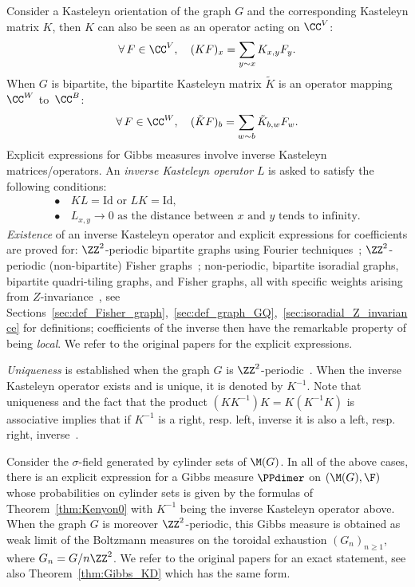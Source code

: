 \documentclass[a4paper,twoside,11pt]{article}
\begin{document}
Consider a Kasteleyn orientation of the graph $G$ and the corresponding Kasteleyn matrix $K$, then $K$ 
can also be seen as an operator acting on $\CC^V$:
\[
\forall\,F\in\CC^V,\quad (KF)_x=\sum_{y\sim x}K_{x,y}F_y.
\]
When $G$ is bipartite, the bipartite Kasteleyn matrix $\tilde{K}$ is an operator mapping $\CC^W$ to~$\CC^B$:
\[
\forall\,F\in\CC^W,\quad (\tilde{K}F)_b=\sum_{w\sim b}\tilde{K}_{b,w}F_w.
\]
Explicit expressions for Gibbs measures involve inverse Kasteleyn matrices/operators. An \emph{inverse Kasteleyn operator}
$L$ is asked to satisfy the following conditions:
\begin{align*}
\bullet &\, KL=\mathrm{Id} \text{ or } LK=\mathrm{Id},\\
\bullet &\, L_{x,y}\rightarrow 0 \text{ as the distance between $x$ and $y$ tends to infinity}.
\end{align*}
\emph{Existence} of an inverse Kasteleyn operator and explicit expressions for coefficients are proved for:
$\ZZ^2$-periodic bipartite graphs using Fourier techniques~\cite{CKP,KOS};  $\ZZ^2$-periodic (non-bipartite) 
Fisher graphs~\cite{BoutillierdeTiliere:iso_perio,Dubedat}; non-periodic, bipartite isoradial graphs, bipartite quadri-tiling graphs,
and Fisher graphs, all with specific weights arising from $Z$-invariance~\cite{Kenyon3,BoutillierdeTiliere:iso_gen,BdtR2}, 
see Sections~\ref{sec:def_Fisher_graph},~\ref{sec:def_graph_GQ},~\ref{sec:isoradial_Z_invariance} for definitions;
coefficients of the inverse then have the remarkable property of being \emph{local}. We refer to the original papers for the explicit expressions. 

\emph{Uniqueness} is established when the graph $G$ is $\ZZ^2$-periodic~\cite{Sheffield0,BoutillierdeTiliere:iso_perio}. When the inverse
Kasteleyn operator exists and is unique, it is denoted by $K^{-1}$. Note that uniqueness and the fact that the product 
$(K K^{-1})K=K(K^{-1}K)$ is associative implies that if $K^{-1}$ is a right, resp. left, inverse it is also a left, resp. right, 
inverse~\cite{Cooke}.

Consider the $\sigma$-field generated by cylinder sets of $\M(G)$. In all of the above cases, there is
an explicit expression for a Gibbs measure $\PPdimer$ on $(\M(G),\F)$
whose probabilities on cylinder sets is given by the formulas of Theorem~\ref{thm:Kenyon0} with $K^{-1}$ being the inverse Kasteleyn 
operator above. When the graph $G$ is moreover $\ZZ^2$-periodic, this Gibbs measure is obtained as weak limit of the Boltzmann measures 
on the toroidal exhaustion $(G_n)_{n\geq 1}$, where $G_n=G/n\ZZ^2$. We refer to the original papers for an exact statement, see also 
Theorem~\ref{thm:Gibbs_KD} which has the same form.
\end{document}
